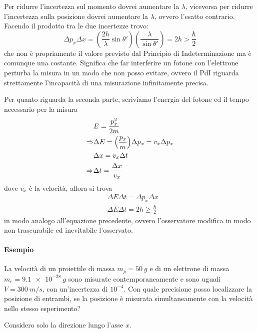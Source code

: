 Per ridurre l'incertezza sul momento dovrei aumentare la $\lambda$, viceversa per ridurre l'incertezza sulla posizione dovrei aumentare la $\lambda$, ovvero l'esatto contrario.
Facendo il prodotto tra le due incertezze trovo:
\begin{equation}
\Delta p_x \Delta x = (\frac{2h}{\lambda} \sin \theta ')(\frac{\lambda}{\sin \theta '}) = 2h > \frac{\hbar}{2}
\end{equation}
che non è propriamente il valore previsto dal Principio di Indeterminazione ma è comunque una costante.
Significa che far interferire un fotone con l'elettrone perturba la misura in un modo che non posso evitare, ovvero il PdI riguarda strettamente l'incapacità di una misurazione infinitamente precisa.

Per quanto riguarda la seconda parte, scriviamo l'energia del fotone ed il tempo necessario per la misura
\begin{equation}
\begin{split}
& E = \frac{ p_x^2}{2m } \\
\Rightarrow & \Delta E = \Bigl(  \frac{ p_x}{m }  \Bigr) \Delta p_x = v_x \Delta p_x \\
& \Delta x = v_x \Delta t \\
\Rightarrow & \Delta t = \frac{ \Delta x}{v_x }
\end{split}
\end{equation}
dove $v_x$ è la velocità, allora si trova
\begin{equation}
\begin{split}
& \Delta E \Delta t = \Delta p_x \Delta x \\
& \Delta E \Delta t = 2h \ge \frac{ \hbar}{2 }
\end{split}
\end{equation}
in modo analogo all'equazione precedente, ovvero l'osservatore modifica in modo non trascurabile ed inevitabile l'osservato.


\paragraph{Esempio} La velocità di un proiettile di massa $m_p = \SI{50}{g}$ e di un elettrone di massa
$m_e = \SI{9.1e-28}{g}$ sono misurate contemporaneamente e sono uguali $V = \SI{300}{m/s}$, con un'incertezza di $10^{-4}$.
Con quale precisione posso localizzare la posizione di entrambi, se la posizione è misurata simultaneamente con la velocità nello stesso esperimento?

Considero solo la direzione lungo l'asse $x$.
 
